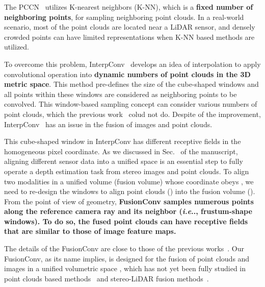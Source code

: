 \documentclass[letterpaper, 10 pt, conference]{ieeeconf}
\makeatletter
\DeclareRobustCommand\onedot{\futurelet\@let@token\@onedot}
\def\@onedot{\ifx\@let@token.\else.\null\fi\xspace}
\def\ie{\emph{i.e}\onedot} \def\Ie{{I.e}\onedot}
\newcommand{\RNum}[1]{\uppercase\expandafter{\romannumeral #1\relax}}
\makeatother
\begin{document}
The PCCN~\cite{continuous_conv} utilizes K-nearest neighbors (K-NN), which is a \textbf{fixed number of neighboring points}, for sampling neighboring point clouds. In a real-world scenario, most of the point clouds are located near a LiDAR sensor, and densely crowded points can have limited representations when K-NN based methods are utilized.

To overcome this problem, InterpConv~\cite{interp_conv} develops an idea of interpolation to apply convolutional operation into \textbf{dynamic numbers of point clouds in the 3D metric space}. This method pre-defines the size of the cube-shaped windows and all points within these windows are considered as neighboring points to be convolved. This window-based sampling concept can consider various numbers of point clouds, which the previous work~\cite{continuous_conv} colud not do. Despite of the improvement, InterpConv~\cite{interp_conv} has an issue in the fusion of images and point clouds. 

This cube-shaped window in InterpConv has different receptive fields in the homogeneous pixel coordinate. As we discussed in Sec.~\textcolor{red}{\RNum{1}} of the manuscript, aligning different sensor data into a unified space is an essential step to fully operate a depth estimation task from stereo images and point clouds. To align two modalities in a unified volume (fusion volume) whose coordinate obeys , we need to re-design the windows to align point clouds () into the fusion volume (). From the point of view of geometry, \textbf{FusionConv samples numerous points along the reference camera ray and its neighbor (\ie, frustum-shape windows). To do so, the fused point clouds can have receptive fields that are similar to those of image feature maps.}

The details of the FusionConv are close to those of the previous works~\cite{continuous_conv,interp_conv}. Our FusionConv, as its name implies, is designed for the fusion of point clouds and images in a unified volumetric space , which has not yet been fully studied in point clouds based methods~\cite{continuous_conv,interp_conv,pointnet,dynamic_graph_conv} and stereo-LiDAR fusion methods~\cite{stereolidar_00,stereolidar_01,stereolidar_norm_costV_ccvn}. 
\end{document}
